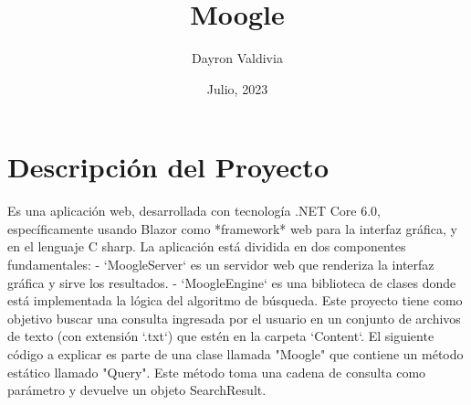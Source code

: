 \documentclass{article}
\begin{document}
\title{Moogle}
\author{Dayron Valdivia}
\date{Julio, 2023}
\maketitle

\section{Descripción del Proyecto }
Es una aplicación web, desarrollada con tecnología .NET Core 6.0, 
específicamente usando Blazor como *framework* web para la interfaz gráfica, 
y en el lenguaje C sharp. 
La aplicación está dividida en dos componentes fundamentales: 
- `MoogleServer` es un servidor web que renderiza la interfaz gráfica y sirve los 
resultados. 
- `MoogleEngine` es una biblioteca de clases donde está implementada la 
lógica del algoritmo de búsqueda. 
Este proyecto tiene como objetivo buscar una consulta ingresada por el usuario 
en un conjunto de archivos de texto (con extensión `.txt`) que estén en la 
carpeta `Content`.
El siguiente código a explicar es parte de una clase llamada "Moogle" que 
contiene un método estático llamado "Query". Este método toma una cadena 
de consulta como parámetro y devuelve un objeto SearchResult. 
\end{document}
